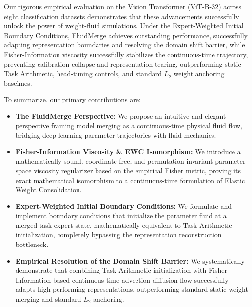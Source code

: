Our rigorous empirical evaluation on the Vision Transformer (ViT-B-32) across eight classification datasets demonstrates that these advancements successfully unlock the power of weight-fluid simulations. Under the Expert-Weighted Initial Boundary Conditions, FluidMerge achieves outstanding performance, successfully adapting representation boundaries and resolving the domain shift barrier, while Fisher-Information viscosity successfully stabilizes the continuous-time trajectory, preventing calibration collapse and representation tearing, outperforming static Task Arithmetic, head-tuning controls, and standard $L_2$ weight anchoring baselines.

To summarize, our primary contributions are:
\begin{itemize}
    \item \textbf{The FluidMerge Perspective:} We propose an intuitive and elegant perspective framing model merging as a continuous-time physical fluid flow, bridging deep learning parameter trajectories with fluid mechanics.
    \item \textbf{Fisher-Information Viscosity \& EWC Isomorphism:} We introduce a mathematically sound, coordinate-free, and permutation-invariant parameter-space viscosity regularizer based on the empirical Fisher metric, proving its exact mathematical isomorphism to a continuous-time formulation of Elastic Weight Consolidation.
    \item \textbf{Expert-Weighted Initial Boundary Conditions:} We formulate and implement boundary conditions that initialize the parameter fluid at a merged task-expert state, mathematically equivalent to Task Arithmetic initialization, completely bypassing the representation reconstruction bottleneck.
    \item \textbf{Empirical Resolution of the Domain Shift Barrier:} We systematically demonstrate that combining Task Arithmetic initialization with Fisher-Information-based continuous-time advection-diffusion flow successfully adapts high-performing representations, outperforming standard static weight merging and standard $L_2$ anchoring.
\end{itemize}
